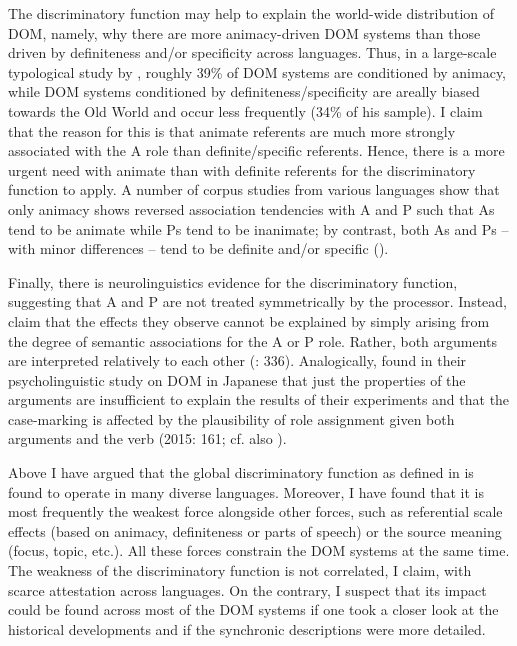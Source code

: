 \documentclass[output=paper]{langsci/langscibook}
\begin{document}
The discriminatory function may help to explain the world-wide distribution of DOM, namely, why there are more animacy-driven DOM systems than those driven by definiteness and/or specificity across languages. Thus, in a large-scale typological study by \citet[295]{Sinnemäki2014}, roughly 39\% of DOM systems are conditioned by animacy, while DOM systems conditioned by definiteness/specificity are areally biased towards the Old World and occur less frequently (34\% of his sample). I claim that the reason for this is that animate referents are much more strongly associated with the A role than definite/specific referents. Hence, there is a more urgent need with animate than with definite referents for the discriminatory function to apply. A number of corpus studies from various languages show that only animacy shows reversed association tendencies with A and P such that As tend to be animate while Ps tend to be inanimate; by contrast, both As and Ps – with minor differences – tend to be definite and/or specific (\citealt{Dahl2000,Hofling2003,Everett2009,FauconnierVerstraete2014}). 

Finally, there is neurolinguistics evidence for the discriminatory function, suggesting that A and P are not treated symmetrically by the processor. Instead, \citet{Bornkessel-SchlesewskySchlesewsky2015} claim that the effects they observe cannot be explained by simply arising from the degree of semantic associations for the A or P role. Rather, both arguments are interpreted relatively to each other (\citealt{Bornkessel-SchlesewskySchlesewsky2015}: 336). Analogically, \citet{KurumadaJaeger2015} found in their psycholinguistic study on DOM in Japanese that just the properties of the arguments are insufficient to explain the results of their experiments and that the case-marking is affected by the plausibility of role assignment given both arguments and the verb (2015: 161; cf. also \citealt{AhnCho2007,FedzechkinaEtAl2012}).

Above I have argued that the global discriminatory function as defined in  is found to operate in many diverse languages. Moreover, I have found that it is most frequently the weakest force alongside other forces, such as referential scale effects (based on animacy, definiteness or parts of speech) or the source meaning (focus, topic, etc.). All these forces constrain the DOM systems at the same time. The weakness of the discriminatory function is not correlated, I claim, with scarce attestation across languages. On the contrary, I suspect that its impact could be found across most of the DOM systems if one took a closer look at the historical developments and if the synchronic descriptions were more detailed. 
\end{document}
